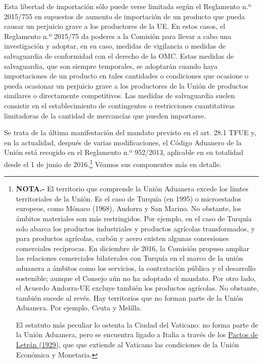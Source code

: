 \documentclass[10pt,a4paper]{article}
\begin{document}
Esta libertad de importación sólo puede verse limitada según el Reglamento n.º 2015/755 en supuestos de aumento de importación de un producto que pueda causar un perjuicio grave a los productores de la UE. En estos casos, el Reglamento n.º 2015/75 da poderes a la Comisión para llevar a cabo una investigación y adoptar, en su caso, medidas de vigilancia o medidas de salvaguardia de conformidad con el derecho de la OMC. Estas medidas de salvaguardia, que son siempre temporales, se adoptarán cuando haya importaciones de un producto en tales cantidades o condiciones que ocasione o pueda ocasionar un perjuicio grave a los productores de la Unión de productos similares o directamente competitivos. Las medidas de salvaguardia suelen consistir en el establecimiento de contingentes o restricciones cuantitativas limitadoras de la cantidad de mercancías que pueden importarse. 

Se trata de la última manifestación del mandato previsto en el art. 28.1 TFUE y, en la actualidad, después de varias modificaciones, el Código Aduanero de la Unión está recogido en el Reglamento n.º 952/2013, aplicable en su totalidad desde el 1 de junio de 2016.\footnote{
\textbf{NOTA.-} El territorio que comprende la Unión Aduanera excede los límtes territoriales de la Unión. Es el caso de Turquía (en 1995) o microestados europeos, como Mónaco (1968), Andorra y San Marino. No obstante, los ámbitos materiales son más restringidos. Por ejemplo, en el caso de Turquía solo abarca los productos industriales y productos agrícolas transformados, y para productos agrícolas, carbón y acero existen algunas concesiones comerciales recíprocas. En diciembre de 2016, la Comisión propuso ampliar las relaciones comerciales bilaterales con Turquía en el marco de la unión aduanera a ámbitos como los servicios, la contratación pública y el desarrollo sostenible; aunque el Consejo aún no ha adoptado el mandato. Por otro lado, el Acuerdo Andorra-UE excluye también los productos agrícolas. No obstante, también sucede al revés. Hay territorios que no forman parte de la Unión Aduanera. Por ejemplo, Ceuta y Melilla.

El estatuto más peculiar lo ostenta la Ciudad del Vaticano: no forma parte de la Unión Aduanera, pero se encuentra ligado a Italia a través de los \href{https://es.wikipedia.org/wiki/Pactos_de_Letrán}{Pactos de Letrán (1929)}, que que extiende al Vaticano las condiciones de la Unión Económica y Monetaria.
} Véamos sus componentes más en detalle.
\end{document}
